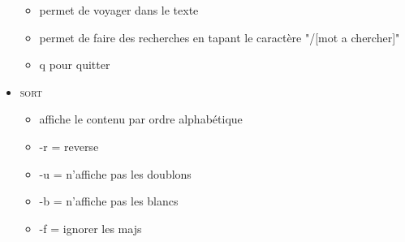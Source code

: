 \documentclass[a4paper]{article}
\begin{document}
\begin{itemize}[label=\textbullet, font=\Large]
\begin{itemize}[label=, font=\scriptsize]
        \item permet de voyager dans le texte 
        \item permet de faire des recherches en tapant le caractère "/[mot a chercher]"
        \item q pour quitter
      \end{itemize}
      \item \textsc{sort}
      \begin{itemize}[label=, font=\scriptsize]
        \item affiche le contenu par ordre alphabétique
        \item -r = reverse
        \item -u = n'affiche pas les doublons
        \item -b = n'affiche pas les blancs
        \item -f = ignorer les majs
      \end{itemize}
    \end{itemize}
\end{document}
